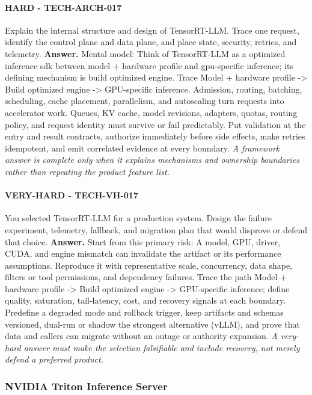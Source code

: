 \paragraph{HARD - TECH-ARCH-017} Explain the internal structure and design of TensorRT-LLM. Trace one request, identify the control plane and data plane, and place state, security, retries, and telemetry.
\textbf{Answer.} Mental model: Think of TensorRT-LLM as a optimized inference sdk between model + hardware profile and gpu-specific inference; its defining mechanism is build optimized engine. Trace Model + hardware profile -> Build optimized engine -> GPU-specific inference. Admission, routing, batching, scheduling, cache placement, parallelism, and autoscaling turn requests into accelerator work. Queues, KV cache, model revisions, adapters, quotas, routing policy, and request identity must survive or fail predictably. Put validation at the entry and result contracts, authorize immediately before side effects, make retries idempotent, and emit correlated evidence at every boundary.
\textit{A framework answer is complete only when it explains mechanisms and ownership boundaries rather than repeating the product feature list.}
\paragraph{VERY-HARD - TECH-VH-017} You selected TensorRT-LLM for a production system. Design the failure experiment, telemetry, fallback, and migration plan that would disprove or defend that choice.
\textbf{Answer.} Start from this primary risk: A model, GPU, driver, CUDA, and engine mismatch can invalidate the artifact or its performance assumptions. Reproduce it with representative scale, concurrency, data shape, filters or tool permissions, and dependency failures. Trace the path Model + hardware profile -> Build optimized engine -> GPU-specific inference; define quality, saturation, tail-latency, cost, and recovery signals at each boundary. Predefine a degraded mode and rollback trigger, keep artifacts and schemas versioned, dual-run or shadow the strongest alternative (vLLM), and prove that data and callers can migrate without an outage or authority expansion.
\textit{A very-hard answer must make the selection falsifiable and include recovery, not merely defend a preferred product.}
\subsubsection*{NVIDIA Triton Inference Server}
